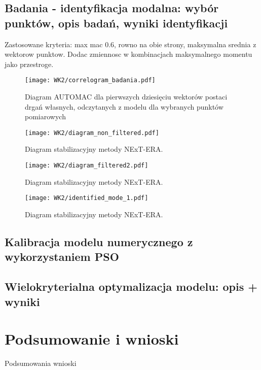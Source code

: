 \section{Badania - identyfikacja modalna: wybór punktów, opis badań, wyniki identyfikacji}
Zastosowane kryteria: max mac 0.6, rowno na obie strony, maksymalna srednia z wektorow punktow. Dodac zmiennosc w kombinacjach maksymalnego momentu jako przestroge.
\begin{figure}[h]
	\centering
	\texttt{[image: WK2/correlogram\_badania.pdf]}
	\captionsetup{justification=centering}
	\caption{Diagram AUTOMAC dla pierwszych dziesięciu wektorów postaci drgań własnych, odczytanych z modelu dla wybranych punktów pomiarowych}
\end{figure}
\begin{figure}[h]
	\centering
	\texttt{[image: WK2/diagram\_non\_filtered.pdf]}
	\captionsetup{justification=centering}
	\caption{Diagram stabilizacyjny metody NExT-ERA.}
\end{figure}
\begin{figure}[h]
	\centering
	\texttt{[image: WK2/diagram\_filtered2.pdf]}
	\captionsetup{justification=centering}
	\caption{Diagram stabilizacyjny metody NExT-ERA.}
\end{figure}
\begin{figure}[h]
	\centering
	\texttt{[image: WK2/identified\_mode\_1.pdf]}
	\captionsetup{justification=centering}
	\caption{Diagram stabilizacyjny metody NExT-ERA.}
\end{figure}

\section{Kalibracja modelu numerycznego z wykorzystaniem PSO}
\section{Wielokryterialna optymalizacja modelu: opis + wyniki}
\chapter{Podsumowanie i wnioski}
Podsumowania wnioski